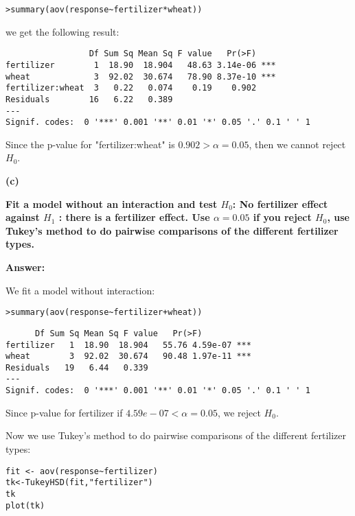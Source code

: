 \documentclass[letterpaper,11pt]{article}
\begin{document}
\begin{lstlisting}
>summary(aov(response~fertilizer*wheat))
\end{lstlisting}
  we get the following result:

\begin{lstlisting}
                 Df Sum Sq Mean Sq F value   Pr(>F)
fertilizer        1  18.90  18.904   48.63 3.14e-06 ***
wheat             3  92.02  30.674   78.90 8.37e-10 ***
fertilizer:wheat  3   0.22   0.074    0.19    0.902
Residuals        16   6.22   0.389
---
Signif. codes:  0 '***' 0.001 '**' 0.01 '*' 0.05 '.' 0.1 ' ' 1
\end{lstlisting}

Since the p-value for "fertilizer:wheat" is $0.902>\alpha = 0.05$, then we cannot reject $H_0$.

\bigbreak
\begin{addmargin}[-1.1em]{0em}
\textbf{(c)}\par\end{addmargin}
\textbf{Fit a model without an interaction and test $H_0$: No fertilizer effect against $H_1$ : there is a fertilizer effect. Use $\alpha = 0.05$ if you reject $H_0$, use Tukey’s method to do pairwise comparisons of the different fertilizer types.}\par
    \bigbreak
    \begin{addmargin}[-0.5em]{0em}    \textbf{Answer: }\end{addmargin}
We fit a model without interaction:
\begin{lstlisting}
>summary(aov(response~fertilizer+wheat))
\end{lstlisting}

\begin{lstlisting}
      Df Sum Sq Mean Sq F value   Pr(>F)
fertilizer   1  18.90  18.904   55.76 4.59e-07 ***
wheat        3  92.02  30.674   90.48 1.97e-11 ***
Residuals   19   6.44   0.339
---
Signif. codes:  0 '***' 0.001 '**' 0.01 '*' 0.05 '.' 0.1 ' ' 1
\end{lstlisting}

Since p-value for fertilizer if $4.59e-07<\alpha = 0.05$, we reject $H_0$.\par
Now we use Tukey's method to do pairwise comparisons of the different fertilizer types:

\begin{lstlisting}
fit <- aov(response~fertilizer)
tk<-TukeyHSD(fit,"fertilizer")
tk
plot(tk)
\end{lstlisting}
\end{document}
